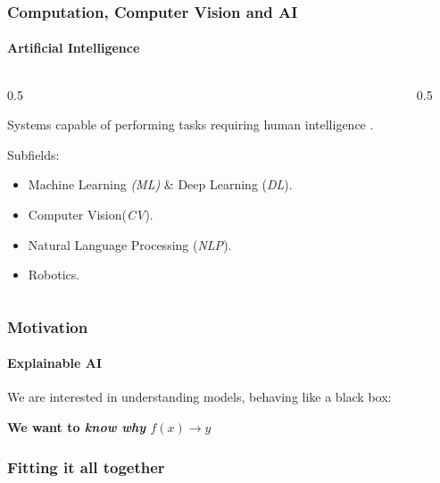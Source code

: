 \begin{frame}[t]
    \frametitle{Computation, Computer Vision and AI}
    \framesubtitle{Artificial Intelligence}
    \begin{columns}[t]
        \begin{column}{0.5\textwidth}
        {\small
        Systems capable of performing tasks requiring human intelligence 
        \cite{mccarthy2007artificial}.\\\vspace{10pt}\pause

        Subfields:
            \begin{itemize}
                \item Machine Learning \emph{(ML)} \& Deep Learning (\emph{DL}).
                \item Computer Vision(\emph{CV}).
                \item Natural Language Processing (\emph{NLP}).
                \item Robotics.
            \end{itemize}
        }
        \end{column}
        \begin{column}{0.5\textwidth}
            \begin{center}
                
            \end{center}
        \end{column}
    \end{columns}
\end{frame}
\begin{frame}[t]
    \frametitle{Motivation}
    \framesubtitle{Explainable AI}
    \small
    We are interested in understanding models,
    behaving like a black box:\\\vspace{10pt}
    \pause
    \vspace{10pt}
    \begin{center}
        \textbf{We want to \emph{know why} $f(x)\rightarrow y$}
    \end{center}   
\end{frame}
\begin{frame}[t]
    \frametitle{Fitting it all together}
    \begin{center}
        
    \end{center}
\end{frame}